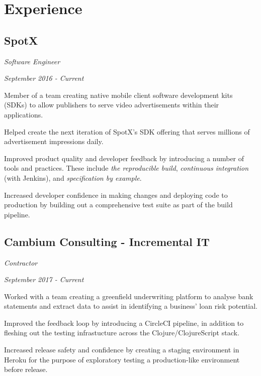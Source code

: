 \section*{Experience}
\subsection*{SpotX}
\noindent\begin{minipage}[b]{0.5\textwidth}
  \flushleft
  \emph{Software Engineer}
\end{minipage}
\noindent\begin{minipage}[b]{0.5\textwidth}
  \flushright
  \emph{September 2016 - Current}
\end{minipage}

Member of a team creating native mobile client software development kits (SDKs)
to allow publishers to serve video advertisements within their applications.

Helped create the next iteration of SpotX's SDK offering that serves millions of
advertisement impressions daily.

Improved product quality and developer feedback by introducing a number of tools
and practices. These include \emph{the reproducible build}, \emph{continuous
integration} (with Jenkins), and \emph{specification by example}.

Increased developer confidence in making changes and deploying code to
production by building out a comprehensive test suite as part of the build
pipeline.

\subsection*{Cambium Consulting - Incremental IT}
\noindent\begin{minipage}[b]{0.5\textwidth}
  \flushleft
  \emph{Contractor}
\end{minipage}
\noindent\begin{minipage}[b]{0.5\textwidth}
  \flushright
  \emph{September 2017 - Current}
\end{minipage}

Worked with a team creating a greenfield underwriting platform to analyse bank
statements and extract data to assist in identifying a business' loan risk
potential.

Improved the feedback loop by introducing a CircleCI pipeline, in addition
to fleshing out the testing infrastucture across the Clojure/ClojureScript
stack.

Increased release safety and confidence by creating a staging environment in
Heroku for the purpose of exploratory testing a production-like environment
before release.

